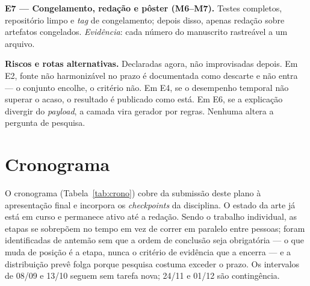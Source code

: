 \documentclass[conference]{IEEEtran}
\begin{document}
\textbf{E7 --- Congelamento, redação e pôster (M6--M7).} Testes completos,
repositório limpo e \emph{tag} de congelamento; depois disso, apenas redação
sobre artefatos congelados. \emph{Evidência}: cada número do manuscrito
rastreável a um arquivo.

\textbf{Riscos e rotas alternativas.} Declaradas agora, não improvisadas depois.
Em E2, fonte não harmonizável no prazo é documentada como descarte e não entra ---
o conjunto encolhe, o critério não. Em E4, se o desempenho temporal não superar o
acaso, o resultado é publicado como está. Em E6, se a explicação divergir do
\emph{payload}, a camada vira gerador por regras. Nenhuma altera a pergunta de
pesquisa.

\section{Cronograma}
\label{sec:crono}

O cronograma (Tabela~\ref{tab:crono}) cobre da submissão deste plano à
apresentação final e incorpora os \emph{checkpoints} da disciplina. O estado da
arte já está em curso e permanece ativo até a redação. Sendo o trabalho
individual, as etapas se sobrepõem no tempo em vez de correr em paralelo entre
pessoas; foram identificadas de antemão sem que a ordem de conclusão seja
obrigatória --- o que muda de posição é a etapa, nunca o critério de evidência
que a encerra --- e a distribuição prevê folga porque pesquisa costuma exceder o
prazo. Os intervalos de 08/09 e 13/10 seguem sem tarefa nova; 24/11 e 01/12 são
contingência.
\end{document}
